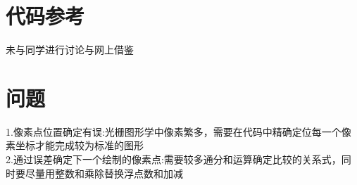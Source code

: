 \documentclass[12pt,a4paper]{article}
\begin{document}
\section{代码参考}
未与同学进行讨论与网上借鉴\\
\section{问题}
1.像素点位置确定有误:光栅图形学中像素繁多，需要在代码中精确定位每一个像素坐标才能完成较为标准的图形\\
2.通过误差确定下一个绘制的像素点:需要较多通分和运算确定比较的关系式，同时要尽量用整数和乘除替换浮点数和加减\\
\end{document}

